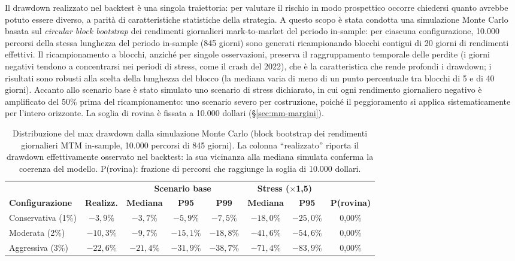 Il drawdown realizzato nel backtest è una singola traiettoria: per valutare
il rischio in modo prospettico occorre chiedersi quanto avrebbe potuto
essere diverso, a parità di caratteristiche statistiche della strategia. A
questo scopo è stata condotta una simulazione Monte Carlo basata sul
\emph{circular block bootstrap} dei rendimenti giornalieri mark-to-market
del periodo in-sample: per ciascuna configurazione, 10.000 percorsi della
stessa lunghezza del periodo in-sample (845 giorni) sono generati
ricampionando blocchi contigui di 20 giorni di rendimenti effettivi. Il
ricampionamento a blocchi, anziché per singole osservazioni, preserva il
raggruppamento temporale delle perdite (i giorni negativi tendono a
concentrarsi nei periodi di stress, come il crash del 2022), che è la
caratteristica che rende profondi i drawdown; i risultati sono robusti alla
scelta della lunghezza del blocco (la mediana varia di meno di un punto
percentuale tra blocchi di 5 e di 40 giorni). Accanto allo scenario base è
stato simulato uno scenario di stress dichiarato, in cui ogni rendimento
giornaliero negativo è amplificato del 50\% prima del ricampionamento: uno
scenario severo per costruzione, poiché il peggioramento si applica
sistematicamente per l'intero orizzonte. La soglia di rovina è fissata a
10.000 dollari (\S\ref{sec:mm-margini}).

\begin{table}[H]
\centering
\caption{Distribuzione del max drawdown dalla simulazione Monte Carlo
(block bootstrap dei rendimenti giornalieri MTM in-sample, 10.000 percorsi
di 845 giorni). La colonna ``realizzato'' riporta il drawdown
effettivamente osservato nel backtest: la sua vicinanza alla mediana
simulata conferma la coerenza del modello. P(rovina): frazione di percorsi
che raggiunge la soglia di 10.000 dollari.}
\label{tab:montecarlo-dd}
\footnotesize
\setlength{\tabcolsep}{3pt}
\begin{tabular}{lccccccc}
\toprule
 & & \multicolumn{3}{c}{\textbf{Scenario base}} & \multicolumn{2}{c}{\textbf{Stress ($\times$1,5)}} & \\
\cmidrule(lr){3-5}\cmidrule(lr){6-7}
\textbf{Configurazione} & \textbf{Realizz.} & \textbf{Mediana} & \textbf{P95} & \textbf{P99} & \textbf{Mediana} & \textbf{P95} & \textbf{P(rovina)} \\
\midrule
Conservativa (1\%) & $-3{,}9\%$  & $-3{,}7\%$  & $-5{,}9\%$  & $-7{,}5\%$  & $-18{,}0\%$ & $-25{,}0\%$ & 0{,}00\% \\
Moderata (2\%)     & $-10{,}3\%$ & $-9{,}7\%$  & $-15{,}1\%$ & $-18{,}8\%$ & $-41{,}6\%$ & $-54{,}6\%$ & 0{,}00\% \\
Aggressiva (3\%)   & $-22{,}6\%$ & $-21{,}4\%$ & $-31{,}9\%$ & $-38{,}7\%$ & $-71{,}4\%$ & $-83{,}9\%$ & 0{,}00\% \\
\bottomrule
\end{tabular}
\end{table}


